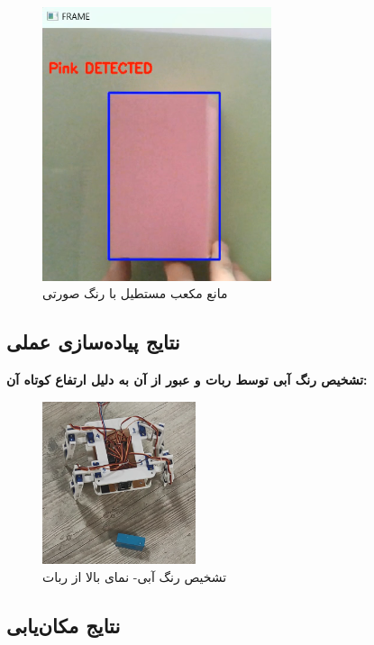 \begin{figure}[H]
	\centering
	\includegraphics[width=0.6\textwidth]{./images/Chapter2/PinkDetected}	
	\caption[مانع مکعب مستطیل با رنگ صورتی]{مانع مکعب مستطیل با رنگ صورتی}
	\label{PinkDetected}
\end{figure}
\noindent
\unskip

\newpage
\subsection{نتایج پیاده‌سازی عملی}

\textbf{تشخیص رنگ آبی توسط ربات و عبور از آن به دلیل ارتفاع کوتاه آن:}

\begin{figure}[H]
	\centering
	\includegraphics[width=0.4\textwidth]{./images/Chapter5/BlueBackUpview}	
	\caption[-نمای بالا از ربات تشخیص رنگ آبی]{تشخیص رنگ آبی- نمای بالا از ربات}
	\label{تشخیص رنگ آبی}
\end{figure}
\noindent
\unskip

\newpage
\subsection{نتایج مکان‌یابی}

